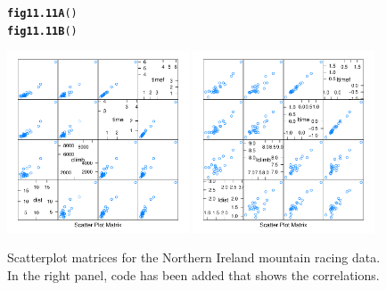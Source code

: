 \documentclass[12pt, a4paper,  BCOR=8.25mm, DIV=15]{scrartcl}\usepackage[]{graphicx}\usepackage[]{color}
\makeatletter
\newcommand{\hlstd}[1]{\textcolor[rgb]{0.345,0.345,0.345}{#1}}%
\newcommand{\hlkwd}[1]{\textcolor[rgb]{0.737,0.353,0.396}{\textbf{#1}}}%
\newenvironment{kframe}{%
 \def\at@end@of@kframe{}%
 \ifinner\ifhmode%
  \def\at@end@of@kframe{\end{minipage}}%
  \begin{minipage}{\columnwidth}%
 \fi\fi%
 \def\FrameCommand##1{\hskip\@totalleftmargin \hskip-\fboxsep
 \colorbox{shadecolor}{##1}\hskip-\fboxsep
     \hskip-\linewidth \hskip-\@totalleftmargin \hskip\columnwidth}%
 \MakeFramed {\advance\hsize-\width
   \@totalleftmargin\z@ \linewidth\hsize
   \@setminipage}}%
 {\par\unskip\endMakeFramed%
 \at@end@of@kframe}
\newenvironment{knitrout}{}{} %
\makeatother
\begin{document}
\begin{figure}[H]
\begin{knitrout}
\color{fgcolor}\begin{kframe}
\begin{alltt}
\hlkwd{fig11.11A}\hlstd{()}
\hlkwd{fig11.11B}\hlstd{()}
\end{alltt}
\end{kframe}

{\centering \includegraphics[width=0.48\textwidth]{figs/reg-splot2-ni-11-11e-1} 
\includegraphics[width=0.48\textwidth]{figs/reg-splot2-ni-11-11e-2} 

}



\end{knitrout}
\caption{Scatterplot matrices for the Northern Ireland mountain racing
  data. In the right panel, code has been added that shows the
  correlations.
\label{fig:nimra-reg}}
\end{figure}
\end{document}
